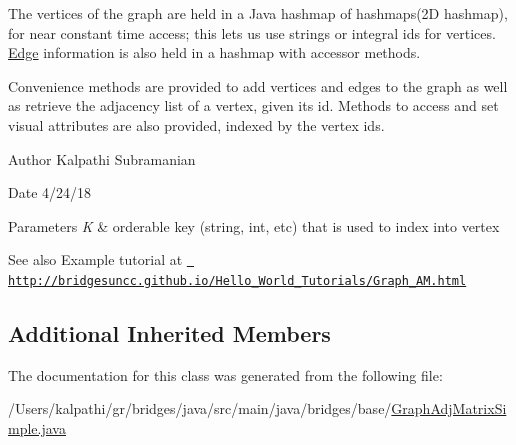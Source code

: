 The vertices of the graph are held in a Java hashmap of hashmaps(2\+D hashmap), for near constant time access; this lets us use strings or integral ids for vertices. \mbox{\hyperlink{classbridges_1_1base_1_1_edge}{Edge}} information is also held in a hashmap with accessor methods.

Convenience methods are provided to add vertices and edges to the graph as well as retrieve the adjacency list of a vertex, given its id. Methods to access and set visual attributes are also provided, indexed by the vertex ids.

\begin{DoxyAuthor}{Author}
Kalpathi Subramanian
\end{DoxyAuthor}
\begin{DoxyDate}{Date}
4/24/18
\end{DoxyDate}

\begin{DoxyParams}{Parameters}
{\em K} & orderable key (string, int, etc) that is used to index into vertex\\
\hline
\end{DoxyParams}
\begin{DoxySeeAlso}{See also}
Example tutorial at \href{http://bridgesuncc.github.io/Hello_World_Tutorials/Graph_AM.html}{\texttt{ http\+://bridgesuncc.\+github.\+io/\+Hello\+\_\+\+World\+\_\+\+Tutorials/\+Graph\+\_\+\+A\+M.\+html}} 
\end{DoxySeeAlso}
\subsection*{Additional Inherited Members}


The documentation for this class was generated from the following file\+:\begin{DoxyCompactItemize}
\item 
/\+Users/kalpathi/gr/bridges/java/src/main/java/bridges/base/\mbox{\hyperlink{_graph_adj_matrix_simple_8java}{Graph\+Adj\+Matrix\+Simple.\+java}}\end{DoxyCompactItemize}
